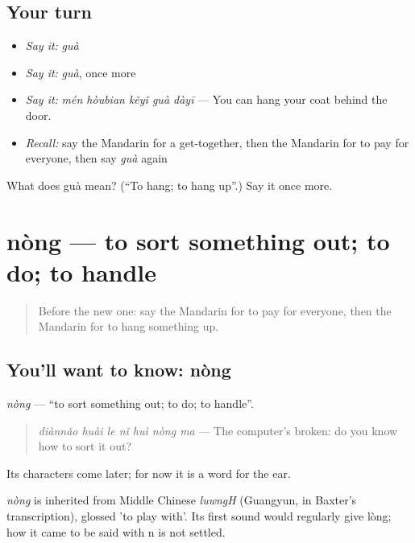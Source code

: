 \subsection*{Your turn}
\begin{itemize}
\raggedright
  \item \emph{Say it:} \emph{guà}
  \item \emph{Say it:} \emph{guà}, once more
  \item \emph{Say it:} \emph{mén hòubian kěyǐ guà dàyī} — You can hang your coat behind the door.
  \item \emph{Recall:} say the Mandarin for a get-together, then the Mandarin for to pay for everyone, then say \emph{guà} again
\end{itemize}

\begin{tcolorbox}[breakable,colback=teal!4,colframe=teal!35!black,title={Before you move on}]
What does guà mean? (\textquotedblleft{}To hang; to hang up\textquotedblright{}.) Say it once more.
\end{tcolorbox}
\section[nòng]{nòng — to sort something out; to do; to handle}

\label{lesson:ZH-C174-nong}



\begin{quote}
Before the new one: say the Mandarin for to pay for everyone, then the Mandarin for to hang something up.
\end{quote}

\subsection*{You'll want to know: nòng}
\emph{nòng} — \textquotedblleft{}to sort something out; to do; to handle\textquotedblright{}.

\begin{quote}
\emph{diànnǎo huài le nǐ huì nòng ma} — The computer's broken: do you know how to sort it out?
\end{quote}

Its characters come later; for now it is a word for the ear.

\begin{cousinweb}
\emph{nòng} is inherited from Middle Chinese \emph{luwngH} (Guangyun, in Baxter's transcription), glossed 'to play with'. Its first sound would regularly give lòng; how it came to be said with n is not settled.
\end{cousinweb}

